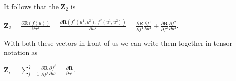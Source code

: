 \documentclass[12pt, a4paper]{article}
\begin{document}
\vspace{6mm}

\begin{flushleft}

    It follows that the $\mathbf{Z}_2$ is\par
    
\end{flushleft}
    
\vspace{6mm}

        \centerline{$\mathbf{Z}_2=\frac{\partial \mathbf{R}(f(u))}{\partial u^2}=\frac{\partial \mathbf{R}(f^1(u^1,u^2),f^2(u^1,u^2))}{\partial u^2}=\frac{\partial \mathbf{R}}{\partial f^1}\frac{\partial f^1}{\partial u^2}+\frac{\partial \mathbf{R}}{\partial f^2}\frac{\partial f^2}{\partial u^2}$.}
        
\vspace{6mm}

    With both these vectors in front of us we can write them together in tensor notation as\par
    
\vspace{6mm}

        \centerline{$\mathbf{Z}_i=\sum\limits_{j=1}^2 \frac{\partial \mathbf{R}}{\partial f^j}\frac{\partial f^j}{\partial u^i}=\frac{\partial\mathbf{R}}{\partial u^i}$.}
        
\end{document}
